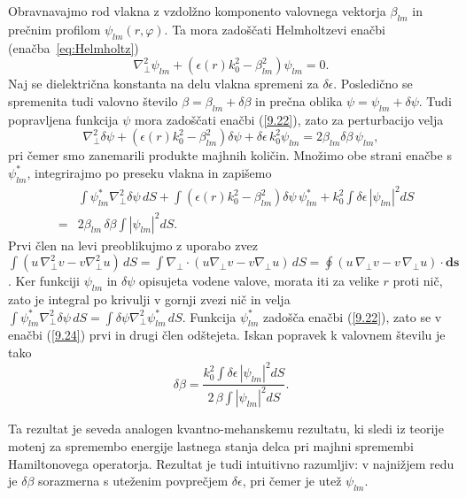 Obravnavajmo rod vlakna z vzdolžno komponento valovnega vektorja $\beta_{lm}$ in prečnim
profilom $\psi_{lm}\left(r,\varphi\right).$ Ta mora zadoščati Helmholtzevi enačbi 
(enačba~\ref{eq:Helmholtz})
\begin{equation}
\nabla_{\bot}^{2}\psi_{lm}+\left(\epsilon(r)k_{0}^{2}-\beta_{lm}^{2}\right)\psi_{lm}=0.
\label{9.22}
\end{equation}
Naj se dielektrična konstanta na delu vlakna spremeni za $\delta\epsilon.$
Posledično se spremenita tudi valovno število $\beta=\beta_{lm}+\delta\beta$
in prečna oblika $\psi=\psi_{lm}+\delta\psi.$ Tudi popravljena funkcija
$\psi$ mora zadoščati enačbi (\ref{9.22}), zato za perturbacijo velja
\begin{equation}
\nabla_{\bot}^{2}\delta\psi+\left(\epsilon(r)k_{0}^{2}-\beta_{lm}^{2}\right)\delta\psi+
\delta\epsilon\, k_{0}^{2}\psi_{lm}=2\beta_{lm}\delta\beta\,\psi_{lm},
\label{9.23}
\end{equation}
pri čemer smo zanemarili produkte majhnih količin. Množimo obe strani
enačbe s $\psi_{lm}^{*}$, integrirajmo po preseku vlakna in zapišemo
\begin{eqnarray}
 &  & \int\psi_{lm}^{*}\nabla_{\bot}^{2}\delta\psi\,
 dS+\int\left(\epsilon(r)k_{0}^{2}-\beta_{lm}^{2}\right)
 \delta\psi\,\psi_{lm}^{*}+k_{0}^{2}\int\delta\epsilon\,\left|\psi_{lm}\right|^{2}dS\label{9.24}\\
 & = & 2\beta_{lm}\,\delta\beta\int\left|\psi_{lm}\right|^{2}dS.
\end{eqnarray}
Prvi člen na levi preoblikujmo z uporabo zvez $\int(u\,\nabla_{\bot}^{2}v-v\nabla_{\bot}^{2}u)\,
dS=\int\nabla_{\bot}\cdot(u\nabla_{\bot}v-v\nabla_{\bot}u)\, 
dS=\oint (u\,\nabla_{\bot}v-v\,\nabla_{\bot}u)\cdot \mathbf{ds}$.
Ker funkciji $\psi_{lm}$ in $\delta\psi$ opisujeta vodene valove,
morata iti za velike $r$ proti nič, zato je integral po krivulji
v gornji zvezi nič in velja $\int\psi_{lm}^{*}\nabla_{\bot}^{2}\delta\psi\,
dS=\int\delta\psi\nabla_{\bot}^{2}\psi_{lm}^{*}\, dS$.
Funkcija $\psi_{lm}^{*}$ zadošča enačbi (\ref{9.22}), zato se v enačbi (\ref{9.24})
prvi in drugi člen odštejeta. Iskan popravek k valovnem številu je tako 
\begin{equation}
\delta\beta=\frac{k_{0}^{2}\int\delta\epsilon\,\left|\psi_{lm}\right|^{2}dS}{2\,
\beta\int\left|\psi_{lm}\right|^{2}dS}.
\label{9.25}
\end{equation}
\begin{remark}
Ta rezultat je seveda analogen kvantno-mehanskemu rezultatu, ki sledi iz 
teorije motenj za spremembo energije lastnega stanja delca pri majhni 
spremembi Hamiltonovega operatorja. Rezultat je tudi intuitivno razumljiv: v
najnižjem redu je $\delta\beta$ sorazmerna s uteženim povprečjem
$\delta\epsilon$, pri čemer je utež $\psi_{lm}$.
\end{remark}

